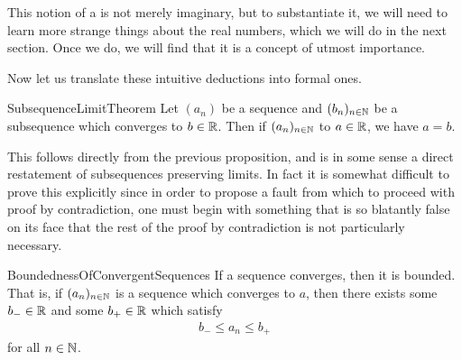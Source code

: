 \documentclass[11pt]{article}
\begin{document}
This notion of a  is not merely imaginary, but to substantiate it, we will need to learn more strange things about the real numbers, which we will do in the next section. Once we do, we will find that it is a concept of utmost importance.

Now let us translate these intuitive deductions into formal ones.

\begin{label corollary}{SubsequenceLimitTheorem}
Let $(a_n)$ be a sequence and $(b_n)_{n\in \mathbb{N}}$ be a subsequence which converges to $b\in \mathbb{R}$. Then if $(a_n)_{n \in \mathbb{N}}$ to $a \in \mathbb{R}$, we have $a = b$.
\end{label corollary}

This follows directly from the previous proposition, and is in some sense a direct restatement of subsequences preserving limits. In fact it is somewhat difficult to prove this explicitly since in order to propose a fault from which to proceed with proof by contradiction, one must begin with something that is so blatantly false on its face that the rest of the proof by contradiction is not particularly necessary.

\begin{label proposition}{BoundednessOfConvergentSequences}
If a sequence converges, then it is bounded. That is, if $(a_n)_{n\in \mathbb{N}}$ is a sequence which converges to $a$, then there exists some $b_- \in \mathbb{R}$ and some $b_+ \in \mathbb{R}$ which satisfy \begin{gather*}
b_- \le a_n \le b_+
\end{gather*}
for all $n\in \mathbb{N}$.
\end{label proposition}
\end{document}
